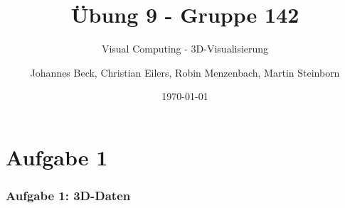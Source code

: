 \documentclass[accentcolor=tud9c,colorbacktitle,inverttitle,landscape,german,presentation,t]{tudbeamer}
\begin{document}
\title{\"Ubung 9 - Gruppe 142}
\subtitle{Visual Computing - 3D-Visualisierung}

\author[Johannes Beck, Christian Eilers, Robin Menzenbach, Martin Steinborn]{Johannes Beck, Christian Eilers, Robin Menzenbach, Martin Steinborn}


\date{\today}

\begin{titleframe}
\end{titleframe}

\section{Aufgabe 1}
	\begin{frame}
		\frametitle{Aufgabe 1: 3D-Daten}
		
	\end{frame}
\end{document}

